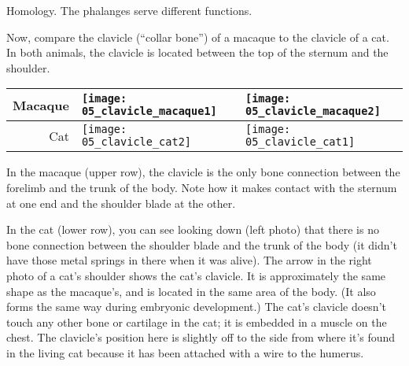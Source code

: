 \documentclass[12pt, hidelinks]{exam}
\newcommand*\AnswerBox[2]{%
    \parbox[t][#1]{0.92\textwidth}{%
    \begin{solution}#2\end{solution}}
}
\begin{document}
\begin{questions}
\begin{parts}
	\AnswerBox{4\baselineskip}{Homology. The phalanges serve different functions.}


\end{parts}

\question
Now, compare the clavicle (``collar bone'') of a macaque to the clavicle of a cat. In both animals, the clavicle is located between the top of the sternum and the shoulder.

\begin{longtable}[c]{@{}rll@{}}
\toprule
Macaque & \texttt{[image: 05\_clavicle\_macaque1]} &
\texttt{[image: 05\_clavicle\_macaque2]}\tabularnewline
\midrule
Cat & \texttt{[image: 05\_clavicle\_cat2]} &
\texttt{[image: 05\_clavicle\_cat1]}\tabularnewline
\bottomrule
\end{longtable}

In the macaque (upper row), the clavicle is the only bone connection between
the forelimb and the trunk of the body. Note how it makes contact with
the sternum at one end and the shoulder blade at the other. 


In the cat (lower row), you can see looking down (left photo) that
there is no bone connection between the shoulder blade and the trunk of
the body (it didn't have those metal springs in there when it was
alive). The arrow in the right photo of a cat's shoulder shows
the cat's clavicle. It is approximately the same shape as the
macaque's, and is located in the same area of the body. (It also forms
the same way during embryonic development.) The cat's clavicle doesn't touch
any other bone or cartilage in the cat; it is embedded in a muscle on the
chest. The clavicle's position here is slightly off to the side from where it's
found in the living cat because it has been attached with a wire to the
humerus.

\end{questions}
\end{document}
